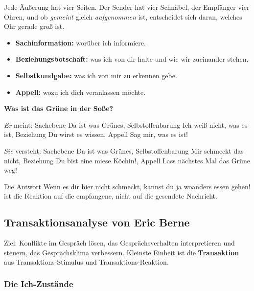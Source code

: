 \documentclass[12pt, a4paper]{article}
\begin{document}
Jede Äußerung hat vier Seiten. Der Sender hat vier Schnäbel, der Empfänger
vier Ohren, und ob \emph{gemeint} gleich \emph{aufgenommen} ist, entscheidet
sich daran, welches Ohr gerade groß ist.

\begin{itemize}
  \item \textbf{Sachinformation:} worüber ich informiere.
  \item \textbf{Beziehungsbotschaft:} was ich von dir halte und wie wir
        zueinander stehen.
  \item \textbf{Selbstkundgabe:} was ich von mir zu erkennen gebe.
  \item \textbf{Appell:} wozu ich dich veranlassen möchte.
\end{itemize}

\begin{examplebox}
\textbf{\glqq Was ist das Grüne in der Soße?\grqq}

\emph{Er} meint:
Sachebene \glqq Da ist was Grünes\grqq{},
Selbstoffenbarung \glqq Ich weiß nicht, was es ist\grqq{},
Beziehung \glqq Du wirst es wissen\grqq{},
Appell \glqq Sag mir, was es ist!\grqq{}

\emph{Sie} versteht:
Sachebene \glqq Da ist was Grünes\grqq{},
Selbstoffenbarung \glqq Mir schmeckt das nicht\grqq{},
Beziehung \glqq Du bist eine miese Köchin!\grqq{},
Appell \glqq Lass nächstes Mal das Grüne weg!\grqq{}

Die Antwort \glqq Wenn es dir hier nicht schmeckt, kannst du ja woanders
essen gehen!\grqq{} ist die Reaktion auf die empfangene, nicht auf die
gesendete Nachricht.
\end{examplebox}

\subsection{Transaktionsanalyse von Eric Berne}

Ziel: Konflikte im Gespräch lösen, das Gesprächsverhalten interpretieren und
steuern, das Gesprächsklima verbessern. Kleinste Einheit ist die
\textbf{Transaktion} aus Transaktions-Stimulus und Transaktions-Reaktion.

\subsubsection{Die Ich-Zustände}
\end{document}

